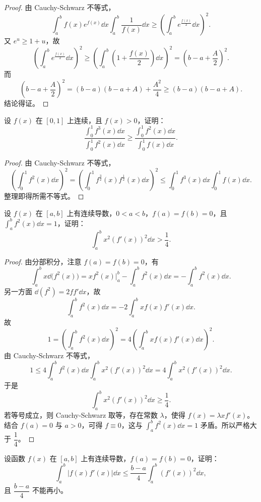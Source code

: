 \begin{proof}
	由 Cauchy-Schwarz 不等式，
	\[
	\int_a^b f(x)e^{f(x)}\dd x\int_a^b\frac1{f(x)}\dd x
	\geqslant \left(\int_a^b e^{\frac{f(x)}2}\dd x\right)^2.
	\]
	又 $e^u\geqslant 1+u$，故
	\[
	\left(\int_a^b e^{\frac{f(x)}2}\dd x\right)^2
	\geqslant \left(\int_a^b \left(1+\frac{f(x)}2\right)\dd x\right)^2
	=\left(b-a+\frac A2\right)^2.
	\]
	而
	\[
	\left(b-a+\frac A2\right)^2
	=(b-a)(b-a+A)+\frac{A^2}{4}
	\geqslant (b-a)(b-a+A).
	\]
	结论得证。
\end{proof}

\begin{problem}
	设 $f(x)$ 在 $[0,1]$ 上连续，且 $f(x)>0$，证明：
	\[
	\frac{\displaystyle\int_0^1 f^3(x)\dd x}{\displaystyle\int_0^1 f^2(x)\dd x}
	\geqslant
	\frac{\displaystyle\int_0^1 f^2(x)\dd x}{\displaystyle\int_0^1 f(x)\dd x}.
	\]
\end{problem}

\begin{proof}
	由 Cauchy-Schwarz 不等式，
	\[
	\left(\int_0^1 f^2(x)\dd x\right)^2
	=\left(\int_0^1 f^{\frac32}(x)f^{\frac12}(x)\dd x\right)^2
	\leqslant \int_0^1 f^3(x)\dd x\int_0^1 f(x)\dd x.
	\]
	整理即得所需不等式。
\end{proof}

\begin{problem}
	设 $f(x)$ 在 $[a,b]$ 上有连续导数，$0<a<b$，$f(a)=f(b)=0$，且 $\displaystyle\int_a^b f^2(x)\dd x=1$，证明：
	\[
	\int_a^b x^2\left(f'(x)\right)^2\dd x>\frac14.
	\]
\end{problem}

\begin{proof}
	由分部积分，注意 $f(a)=f(b)=0$，有
	\[
	\int_a^b x\dd\bigl(f^2(x)\bigr)=x f^2(x)\bigg|_a^b-\int_a^b f^2(x)\dd x=-\int_a^b f^2(x)\dd x.
	\]
	另一方面 $\dd(f^2)=2ff'\dd x$，故
	\[
	\int_a^b f^2(x)\dd x=-2\int_a^b x f(x)f'(x)\dd x.
	\]
	故
	\[
	1=\left(\int_a^b f^2(x)\dd x\right)^2
	=4\left(\int_a^b x f(x)f'(x)\dd x\right)^2.
	\]
	由 Cauchy-Schwarz 不等式，
	\[
	1\leqslant 4\int_a^b f^2(x)\dd x\int_a^b x^2\left(f'(x)\right)^2\dd x
	=4\int_a^b x^2\left(f'(x)\right)^2\dd x.
	\]
	于是
	\[
	\int_a^b x^2\left(f'(x)\right)^2\dd x\geqslant \frac14.
	\]
	若等号成立，则 Cauchy-Schwarz 取等，存在常数 $\lambda$，使得 $f(x)=\lambda x f'(x)$。结合 $f(a)=0$ 与 $a>0$，可得 $f\equiv0$，这与 $\int_a^b f^2(x)\dd x=1$ 矛盾。所以严格大于 $\dfrac14$。
\end{proof}

\begin{problem}
	设函数 $f(x)$ 在 $[a,b]$ 上有连续导数，$f(a)=f(b)=0$，证明：
	\[
	\int_a^b |f(x)f'(x)|\dd x\leqslant \frac{b-a}{4}\int_a^b \left(f'(x)\right)^2\dd x,
	\]
	且 $\dfrac{b-a}{4}$ 不能再小。
\end{problem}

